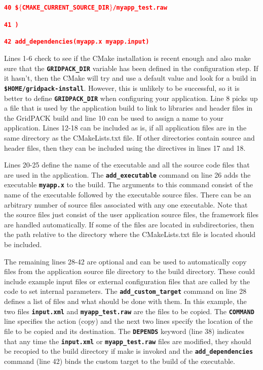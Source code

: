 \documentclass[12pt]{report} %
\begin{document}
\textcolor{red}{\texttt{\textbf{40   \$$\boldsymbol{\mathrm{\{}}$CMAKE\_CURRENT\_SOURCE\_DIR$\boldsymbol{\mathrm{\}}}$/myapp\_test.raw}}}

\textcolor{red}{\texttt{\textbf{41 )}}}

\textcolor{red}{\texttt{\textbf{42 add\_dependencies(myapp.x myapp.input)}}}

Lines 1-6 check to see if the CMake installation is recent enough and also make sure that the \texttt{\textbf{GRIDPACK\_DIR}} variable has been defined in the configuration step. If it hasn't, then the CMake will try and use a default value and look for a build in\texttt{\textbf{ \$HOME/gridpack-install}}. However, this is unlikely to be successful, so it is better to define \texttt{\textbf{GRIDPACK\_DIR}} when configuring your application. Line 8 picks up a file that is used by the application build to link to libraries and header files in the GridPACK build and line 10 can be used to assign a name to your application. Lines 12-18 can be included as is, if all application files are in the same directory as the CMakeLists.txt file. If other directories contain source and header files, then they can be included using the directives in lines 17 and 18.

Lines 20-25 define the name of the executable and all the source code files that are used in the application. The \texttt{\textbf{add\_executable}} command on line 26 adds the executable \texttt{\textbf{myapp.x}} to the build. The arguments to this command consist of the name of the executable followed by the executable source files. There can be an arbitrary number of source files associated with any one executable. Note that the source files just consist of the user application source files, the framework files are handled automatically. If some of the files are located in subdirectories, then the path relative to the directory where the CMakeLists.txt file is located should be included.

The remaining lines 28-42 are optional and can be used to automatically copy files from the application source file directory to the build directory. These could include example input files or external configuration files that are called by the code to set internal parameters. The \texttt{\textbf{add\_custom\_target}} command on line 28 defines a list of files and what should be done with them. In this example, the two files \texttt{\textbf{input.xml}} and \texttt{\textbf{myapp\_test.raw}} are the files to be copied. The \texttt{\textbf{COMMAND}} line specifies the action (copy) and the next two lines specify the location of the file to be copied and its destination. The \texttt{\textbf{DEPENDS}} keyword (line 38) indicates that any time the \texttt{\textbf{input.xml}} or \texttt{\textbf{myapp\_test.raw}} files are modified, they should be recopied to the build directory if make is invoked and the \texttt{\textbf{add\_dependencies}} command (line 42) binds the custom target to the build of the executable.
\end{document}
